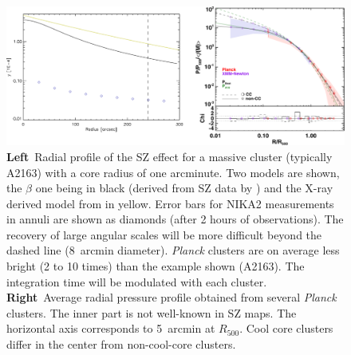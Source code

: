 \documentclass[10pt,a4paper,twoside,graphicx,color]{article}
\begin{document}

\begin{figure}
  \begin{center}
   \includegraphics[width=1\columnwidth]{./Figures/Arsenal_SZprofileAllCrop.pdf}
  \end{center}
  \caption{{\bf Left}~Radial profile of the SZ effect for a massive
    cluster (typically A2163) with a core radius of one arcminute. Two
    models are shown, the $\beta$ one being in black (derived from SZ
    data by \cite{Reese2002}) and the X-ray derived model from
    \cite{Arnaud2010} in yellow. Error bars for NIKA2 measurements in
    annuli are shown as diamonds (after 2 hours of observations). The
    recovery of large angular scales will be more difficult beyond the
    dashed line (8~arcmin diameter). {\sl Planck} clusters are on
    average less bright (2 to 10 times) than the example shown
    (A2163). The integration time will be modulated with each
    cluster. {\bf Right}~Average radial pressure profile obtained from
    several {\sl Planck} clusters. The inner part is not well-known in
    SZ maps. The horizontal axis corresponds to 5~arcmin at
    $R_{500}$. Cool core clusters differ in the center from
    non-cool-core clusters.}
  
\label{Fig:SZprofile}
\end{figure}
   
\end{document}

